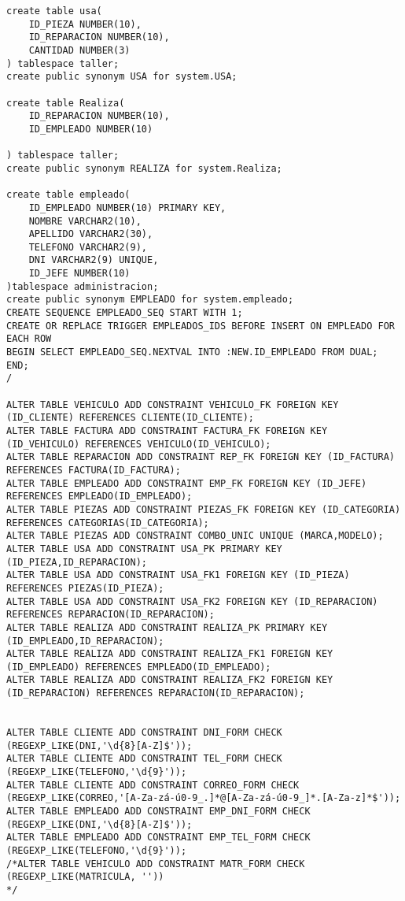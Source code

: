 \begin{lstlisting}[caption=Script .sql para crear la BD (BBDD)]
create table usa(
    ID_PIEZA NUMBER(10),
    ID_REPARACION NUMBER(10),
    CANTIDAD NUMBER(3)
) tablespace taller;
create public synonym USA for system.USA;

create table Realiza(
    ID_REPARACION NUMBER(10),
    ID_EMPLEADO NUMBER(10)

) tablespace taller;
create public synonym REALIZA for system.Realiza;

create table empleado(
    ID_EMPLEADO NUMBER(10) PRIMARY KEY,
    NOMBRE VARCHAR2(10),
    APELLIDO VARCHAR2(30),
    TELEFONO VARCHAR2(9),
    DNI VARCHAR2(9) UNIQUE,
    ID_JEFE NUMBER(10)
)tablespace administracion;
create public synonym EMPLEADO for system.empleado;
CREATE SEQUENCE EMPLEADO_SEQ START WITH 1;
CREATE OR REPLACE TRIGGER EMPLEADOS_IDS BEFORE INSERT ON EMPLEADO FOR EACH ROW
BEGIN SELECT EMPLEADO_SEQ.NEXTVAL INTO :NEW.ID_EMPLEADO FROM DUAL;
END;
/

ALTER TABLE VEHICULO ADD CONSTRAINT VEHICULO_FK FOREIGN KEY (ID_CLIENTE) REFERENCES CLIENTE(ID_CLIENTE);
ALTER TABLE FACTURA ADD CONSTRAINT FACTURA_FK FOREIGN KEY (ID_VEHICULO) REFERENCES VEHICULO(ID_VEHICULO);
ALTER TABLE REPARACION ADD CONSTRAINT REP_FK FOREIGN KEY (ID_FACTURA) REFERENCES FACTURA(ID_FACTURA);
ALTER TABLE EMPLEADO ADD CONSTRAINT EMP_FK FOREIGN KEY (ID_JEFE) REFERENCES EMPLEADO(ID_EMPLEADO);
ALTER TABLE PIEZAS ADD CONSTRAINT PIEZAS_FK FOREIGN KEY (ID_CATEGORIA) REFERENCES CATEGORIAS(ID_CATEGORIA);
ALTER TABLE PIEZAS ADD CONSTRAINT COMBO_UNIC UNIQUE (MARCA,MODELO);
ALTER TABLE USA ADD CONSTRAINT USA_PK PRIMARY KEY (ID_PIEZA,ID_REPARACION);
ALTER TABLE USA ADD CONSTRAINT USA_FK1 FOREIGN KEY (ID_PIEZA) REFERENCES PIEZAS(ID_PIEZA);
ALTER TABLE USA ADD CONSTRAINT USA_FK2 FOREIGN KEY (ID_REPARACION) REFERENCES REPARACION(ID_REPARACION);
ALTER TABLE REALIZA ADD CONSTRAINT REALIZA_PK PRIMARY KEY (ID_EMPLEADO,ID_REPARACION);
ALTER TABLE REALIZA ADD CONSTRAINT REALIZA_FK1 FOREIGN KEY (ID_EMPLEADO) REFERENCES EMPLEADO(ID_EMPLEADO);
ALTER TABLE REALIZA ADD CONSTRAINT REALIZA_FK2 FOREIGN KEY (ID_REPARACION) REFERENCES REPARACION(ID_REPARACION);


ALTER TABLE CLIENTE ADD CONSTRAINT DNI_FORM CHECK (REGEXP_LIKE(DNI,'\d{8}[A-Z]$'));
ALTER TABLE CLIENTE ADD CONSTRAINT TEL_FORM CHECK (REGEXP_LIKE(TELEFONO,'\d{9}'));
ALTER TABLE CLIENTE ADD CONSTRAINT CORREO_FORM CHECK (REGEXP_LIKE(CORREO,'[A-Za-zá-ú0-9_.]*@[A-Za-zá-ú0-9_]*.[A-Za-z]*$'));
ALTER TABLE EMPLEADO ADD CONSTRAINT EMP_DNI_FORM CHECK (REGEXP_LIKE(DNI,'\d{8}[A-Z]$'));
ALTER TABLE EMPLEADO ADD CONSTRAINT EMP_TEL_FORM CHECK (REGEXP_LIKE(TELEFONO,'\d{9}'));
/*ALTER TABLE VEHICULO ADD CONSTRAINT MATR_FORM CHECK (REGEXP_LIKE(MATRICULA, ''))
*/



\end{lstlisting}
